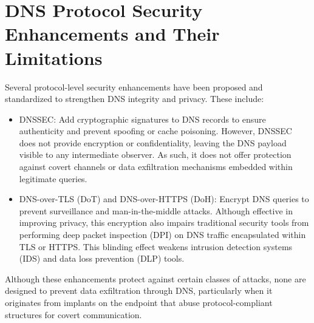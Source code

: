 \documentclass [11pt, proquest] {uwthesis}[2020/02/24]
\begin{document}
\section{DNS Protocol Security Enhancements and Their Limitations}
Several protocol-level security enhancements have been proposed and standardized to strengthen DNS integrity and privacy. These include:
\begin{itemize}
    \item DNSSEC: Add cryptographic signatures to DNS records to ensure authenticity and prevent spoofing or cache poisoning. However, DNSSEC does not provide encryption or confidentiality, leaving the DNS payload visible to any intermediate observer. As such, it does not offer protection against covert channels or data exfiltration mechanisms embedded within legitimate queries.
    \item DNS-over-TLS (DoT) and DNS-over-HTTPS (DoH): Encrypt DNS queries to prevent surveillance and man-in-the-middle attacks. Although effective in improving privacy, this encryption also impairs traditional security tools from performing deep packet inspection (DPI) on DNS traffic encapsulated within TLS or HTTPS. This blinding effect weakens intrusion detection systems (IDS) and data loss prevention (DLP) tools.
\end{itemize}
Although these enhancements protect against certain classes of attacks, none are designed to prevent data exfiltration through DNS, particularly when it originates from implants on the endpoint that abuse protocol-compliant structures for covert communication.
\end{document}
